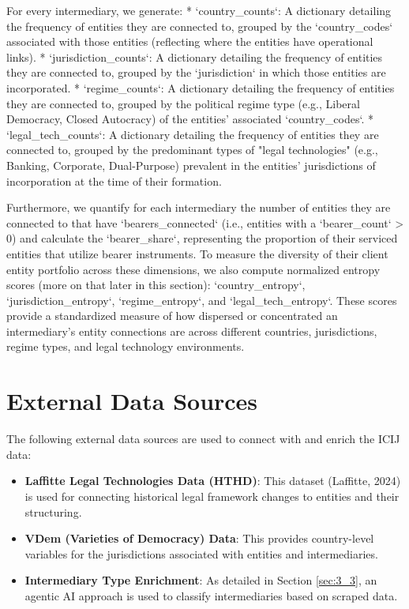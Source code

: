 For every intermediary, we generate:
*   `country_counts`: A dictionary detailing the frequency of entities they are connected to, grouped by the `country_codes` associated with those entities (reflecting where the entities have operational links).
*   `jurisdiction_counts`: A dictionary detailing the frequency of entities they are connected to, grouped by the `jurisdiction` in which those entities are incorporated.
*   `regime_counts`: A dictionary detailing the frequency of entities they are connected to, grouped by the political regime type (e.g., Liberal Democracy, Closed Autocracy) of the entities' associated `country_codes`.
*   `legal_tech_counts`: A dictionary detailing the frequency of entities they are connected to, grouped by the predominant types of "legal technologies" (e.g., Banking, Corporate, Dual-Purpose) prevalent in the entities' jurisdictions of incorporation at the time of their formation.

Furthermore, we quantify for each intermediary the number of entities they are connected to that have `bearers_connected` (i.e., entities with a `bearer_count` > 0) and calculate the `bearer_share`, representing the proportion of their serviced entities that utilize bearer instruments. To measure the diversity of their client entity portfolio across these dimensions, we also compute normalized entropy scores (more on that later in this section): `country_entropy`, `jurisdiction_entropy`, `regime_entropy`, and `legal_tech_entropy`. These scores provide a standardized measure of how dispersed or concentrated an intermediary's entity connections are across different countries, jurisdictions, regime types, and legal technology environments.

\section{External Data Sources}
\label{sec:3_2}

The following external data sources are used to connect with and enrich the ICIJ data:
\begin{itemize}
    \item \textbf{Laffitte Legal Technologies Data (HTHD)}: This dataset (Laffitte, 2024) is used for connecting historical legal framework changes to entities and their structuring.
    \item \textbf{VDem (Varieties of Democracy) Data}: This provides country-level variables for the jurisdictions associated with entities and intermediaries.
    \item \textbf{Intermediary Type Enrichment}: As detailed in Section \ref{sec:3_3}, an agentic AI approach is used to classify intermediaries based on scraped data.
\end{itemize}

